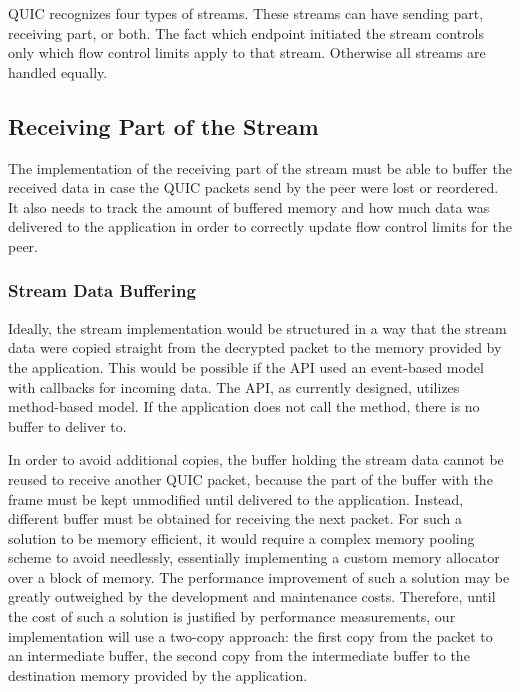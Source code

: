 QUIC recognizes four types of streams. These streams can have sending part, receiving part, or both.
The fact which endpoint initiated the stream controls only which flow control limits apply to that
stream. Otherwise all streams are handled equally.


\subsection{Receiving Part of the Stream}

The implementation of the receiving part of the stream must be able to buffer the received data in
case the QUIC packets send by the peer were lost or reordered. It also needs to track the amount of
buffered memory and how much data was delivered to the application in order to correctly update flow
control limits for the peer.

\subsubsection{Stream Data Buffering}

Ideally, the stream implementation would be structured in a way that the stream data were copied
straight from the decrypted packet to the memory provided by the application. This would be possible
if the API used an event-based model with callbacks for incoming data. The API, as currently
designed, utilizes method-based model. If the application does not call the 
method, there is no buffer to deliver to.

In order to avoid additional copies, the buffer holding the stream data cannot be reused to receive
another QUIC packet, because the part of the buffer with the \STREAM{} frame must be kept unmodified
until delivered to the application. Instead, different buffer must be obtained for receiving the
next packet. For such a solution to be memory efficient, it would require a complex memory pooling
scheme to avoid needlessly, essentially implementing a custom memory allocator over a block of
memory. The performance improvement of such a solution may be greatly outweighed by the development
and maintenance costs. Therefore, until the cost of such a solution is justified by performance
measurements, our implementation will use a two-copy approach: the first copy from the packet to an
intermediate buffer, the second copy from the intermediate buffer to the destination memory provided
by the application.


